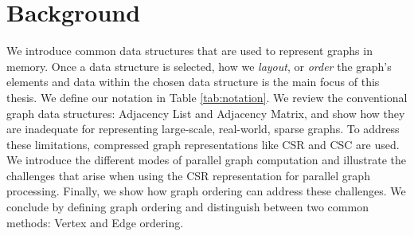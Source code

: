 
\chapter{Background}
\label{ch:Background}




We introduce common data structures that are used to represent graphs in memory. Once a data structure is selected, how we \textit{layout}, or \textit{order} the graph's elements and data within the chosen data structure is the main focus of this thesis. We define our notation in Table \ref{tab:notation}. We review the conventional graph data structures: Adjacency List and Adjacency Matrix, and show how they are inadequate for representing large-scale, real-world, sparse graphs. To address these limitations, compressed graph representations like \ac{CSR} and \ac{CSC} are used. 
We introduce the different modes of parallel graph computation and illustrate the challenges that arise when using the \ac{CSR} representation for parallel graph processing. Finally, we show how graph ordering can address these challenges. We conclude by defining graph ordering and distinguish between two common methods: Vertex and Edge ordering. 
\clearpage


